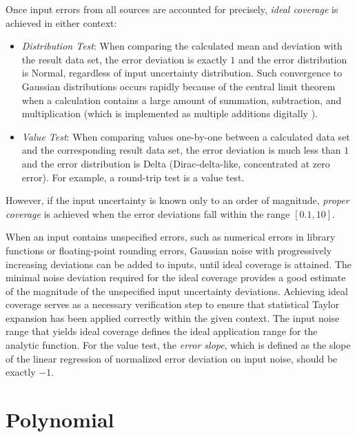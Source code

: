 \documentclass[twoside]{article}
\numberwithin{equation}{section}
\begin{document}
Once input errors from all sources are accounted for precisely, \emph{ideal coverage} is achieved in either context:
\begin{itemize}
\item \emph{Distribution Test}:
When comparing the calculated mean and deviation with the result data set, the error deviation is exactly $1$ and the error distribution is Normal, regardless of input uncertainty distribution.
Such convergence to Gaussian distributions occurs rapidly \cite{Prev_Precision_Arithmetic} because of the central limit theorem \cite{Probability_Statistics} when a calculation contains a large amount of summation, subtraction, and multiplication (which is implemented as multiple additions digitally \cite{Floating_Point_Arithmetic}).

\item \emph{Value Test}: 
When comparing values one-by-one between a calculated data set and the corresponding result data set, the error deviation is much less than $1$ and the error distribution is Delta (Dirac-delta-like, concentrated at zero error).
For example, a round-trip test is a value test.

\end{itemize}

However, if the input uncertainty is known only to an order of magnitude, \emph{proper coverage} is achieved when the error deviations fall within the range $[0.1, 10]$.

When an input contains unspecified errors, such as numerical errors in library functions or floating-point rounding errors, Gaussian noise with progressively increasing deviations can be added to inputs, until ideal coverage is attained.
The minimal noise deviation required for the ideal coverage provides a good estimate of the magnitude of the unspecified input uncertainty deviations.
Achieving ideal coverage serves as a necessary verification step to ensure that statistical Taylor expansion has been applied correctly within the given context.
The input noise range that yields ideal coverage defines the ideal application range for the analytic function.
For the value test, the \emph{error slope}, which is defined as the slope of the linear regression of normalized error deviation on input noise, should be exactly $-1$.




\section{Polynomial}
\label{sec: polynomial}
\end{document}
